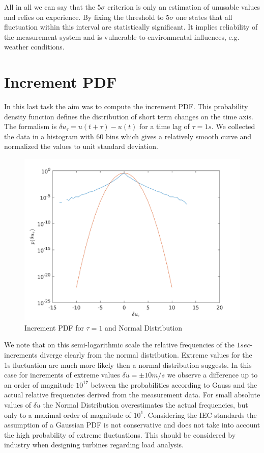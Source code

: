 \documentclass[10pt]{article}
\begin{document}
All in all we can say that the $5\sigma$ criterion is only an estimation of unusable values and relies on experience. By fixing the threshold to $5\sigma$ one states that all fluctuation within this interval are statistically significant. It implies reliability of the measurement system and is vulnerable to environmental influences, e.g. weather conditions.

\section{Increment PDF}
In this last task the aim was to compute the increment PDF. This probability density function defines the distribution of short term changes on the time axis. The formalism is $\delta u_{\tau} = u(t+\tau)-u(t)$ for a time lag of $\tau=1s$. We collected the data in a histogram with $60$ bins which gives a relatively smooth curve and normalized the values to unit standard deviation.
\begin{figure}[htb!]
  \centering
  \includegraphics[width=1\linewidth]{../Plots/tau_pdf_gauss10.png}
  \caption{Increment PDF for $\tau=1$ and Normal Distribution}
  \label{fig:incrementPdf}
\end{figure}
We note that on this semi-logarithmic scale the relative frequencies of the $1sec$-increments diverge clearly from the normal distribution. Extreme values for the 1s fluctuation are much more likely then a normal distribution suggests. In this case for increments of extreme values $\delta u=\pm10 m/s$ we observe a difference up to an order of magnitude $10^{17}$ between the probabilities according to Gauss and the actual relative frequencies derived from the measurement data. For small absolute values of $\delta u$ the Normal Distribution overestimates the actual frequencies, but only to a maximal order of magnitude of $10^1$. Considering the IEC standards the assumption of a Gaussian PDF is not conservative and does not take into account the high probability of extreme fluctuations. This should be considered by industry when designing turbines regarding load analysis.
\newpage
\appendix
\end{document}
